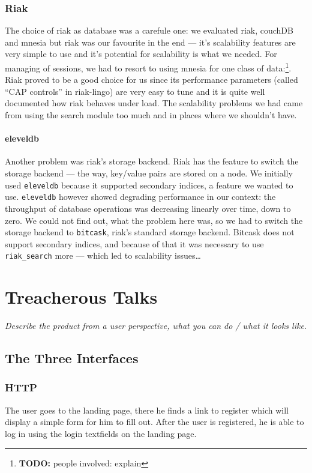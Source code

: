 \documentclass[11pt,a4paper]{report}
\newcommand{\hi}[1]{{\color{red}\em #1\/}\\}
\newcommand{\todo}[1]{\footnote{{\color{red} {\bf TODO:} #1}}}
\begin{document}
\subsection{Riak}
The choice of riak as database was a carefule one: we evaluated riak, couchDB
and mnesia but riak was our favourite in the end --- it's scalability features
are very simple to use and it's potential for scalability is what we needed.
For managing of sessions, we had to resort to using mnesia for one class of
data:\todo{people involved: explain}. \\
Riak proved to be a good choice for us since its performance parameters (called
``CAP controls'' in riak-lingo) are very easy to tune and it is quite well
documented how riak behaves under load. The scalability problems we had
came from using the search module too much and in places where we shouldn't
have.
\subsubsection{eleveldb}
Another problem was riak's storage backend. Riak has the feature to switch the
storage backend --- the way, key/value pairs are stored on a node.
We initially used {\tt eleveldb} because it supported secondary indices, a
feature we wanted to use. {\tt eleveldb} however showed degrading performance
in our context: the throughput of database operations was decreasing linearly
over time, down to zero. We could not find out, what the problem here was, so
we had to switch the storage backend to {\tt bitcask}, riak's standard storage
backend. Bitcask does not support secondary indices, and because of that it was
necessary to use {\tt riak\_search} more --- which led to scalability
issues\ldots

\chapter{Treacherous Talks}
\hi{Describe the product from a user perspective, what you can do / what it looks like.}
\section{The Three Interfaces}
\subsection{HTTP}
The user goes to the landing page, there he finds a link to register which will
display a simple form for him to fill out. After the user is registered, he is
able to log in using the login textfields on the landing page.
\end{document}
